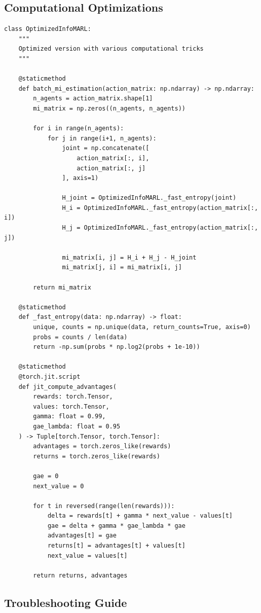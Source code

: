 \documentclass[10pt, letterpaper]{article}
\begin{document}
\subsection{Computational Optimizations}

\begin{lstlisting}
class OptimizedInfoMARL:
    """
    Optimized version with various computational tricks
    """

    @staticmethod
    def batch_mi_estimation(action_matrix: np.ndarray) -> np.ndarray:
        n_agents = action_matrix.shape[1]
        mi_matrix = np.zeros((n_agents, n_agents))

        for i in range(n_agents):
            for j in range(i+1, n_agents):
                joint = np.concatenate([
                    action_matrix[:, i],
                    action_matrix[:, j]
                ], axis=1)

                H_joint = OptimizedInfoMARL._fast_entropy(joint)
                H_i = OptimizedInfoMARL._fast_entropy(action_matrix[:, i])
                H_j = OptimizedInfoMARL._fast_entropy(action_matrix[:, j])

                mi_matrix[i, j] = H_i + H_j - H_joint
                mi_matrix[j, i] = mi_matrix[i, j]

        return mi_matrix

    @staticmethod
    def _fast_entropy(data: np.ndarray) -> float:
        unique, counts = np.unique(data, return_counts=True, axis=0)
        probs = counts / len(data)
        return -np.sum(probs * np.log2(probs + 1e-10))

    @staticmethod
    @torch.jit.script
    def jit_compute_advantages(
        rewards: torch.Tensor,
        values: torch.Tensor,
        gamma: float = 0.99,
        gae_lambda: float = 0.95
    ) -> Tuple[torch.Tensor, torch.Tensor]:
        advantages = torch.zeros_like(rewards)
        returns = torch.zeros_like(rewards)

        gae = 0
        next_value = 0

        for t in reversed(range(len(rewards))):
            delta = rewards[t] + gamma * next_value - values[t]
            gae = delta + gamma * gae_lambda * gae
            advantages[t] = gae
            returns[t] = advantages[t] + values[t]
            next_value = values[t]

        return returns, advantages
\end{lstlisting}

\subsection{Troubleshooting Guide}
\end{document}
